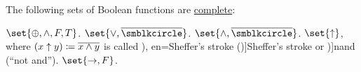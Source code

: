\begin{proposition}\label{thm:complete_sets_of_boolean_functions}
  The following sets of Boolean functions are \hyperref[def:boolean_closure/complete]{complete}:
  \begin{thmenum}
     \( \set{ \oplus, \wedge, F, T } \).
     \( \set{ \vee, \oline{\anon} } \).
     \( \set{ \wedge, \oline{\anon} } \).
     \( \set{ \uparrow } \), where \( (x \uparrow y) \coloneqq \oline{x \wedge y} \) is called \term[ru=штрих Шеффера (\cite[29]{Эдельман1975}), en=Sheffer's stroke (\cite[45]{Birkhoff1967})]{Sheffer's stroke} or \term[en=nand (\cite[46]{Rosen1999})]{nand} (\enquote{not and}).
     \( \set{ \rightarrow, F } \).
  \end{thmenum}
\end{proposition}
